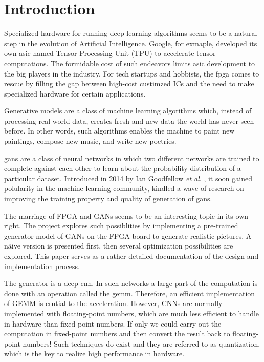 
\chapter{Introduction}

Specialized hardware for running deep learning algorithms seems to be a natural step in the evolution of
Artificial Intelligence.  Google, for exmaple, developed its own \gls{asic} named Tensor Processing Unit (TPU)
to accelerate tensor computations. The formidable cost of such endeavors limits \gls{asic} development to
the big players in the industry. For tech startups and hobbists, the \gls{fpga} comes to
rescue by filling the gap between high-cost custimzed ICs and the need to make specialized hardware for certain
applications.

Generative models are a class of machine learning algorithms which, instead of processing real world data,
creates fresh and new data the world has never seen before. In other words, such algorithms enables
the machine to paint new paintings, compose new music, and write new poetries.

\gls{gan}s are a class of neural networks in which two different networks are
trained to complete against each other to learn about the probability distribution of a particular dataset.
Introduced in 2014 by Ian Goodfellow \textit{et al}. \cite{goodfellow:gan}, it soon gained polularity in the machine learning
community, kindled a wave of research on improving the training property and quality of generation of \gls{gan}s.

The marriage of FPGA and GANs seems to be an interesting topic in its own right. The project explores such
possiblities by implementing a pre-trained generator model of GANs on the FPGA board to generate realistic
pictures. A näive version is presented first, then several optimization possibilities are explored. This
paper serves as a rather detailed documentation of the design and implementation process.

The generator is a deep \gls{cnn}. In such networks a large part of the computation is
done with an operation called the \gls{gemm}. Therefore, an efficient implementation
of GEMM is crutial to the acceleration. However, CNNs are normally implemented with floating-point numbers,
which are much less efficient to handle in hardware than fixed-point numbers. If only we could carry out
the computation in fixed-point numbers and then convert the result back to floating-point numbers! Such
techniques do exist and they are referred to as quantization, which is the key to realize high performance
in hardware.

\clearpage %
